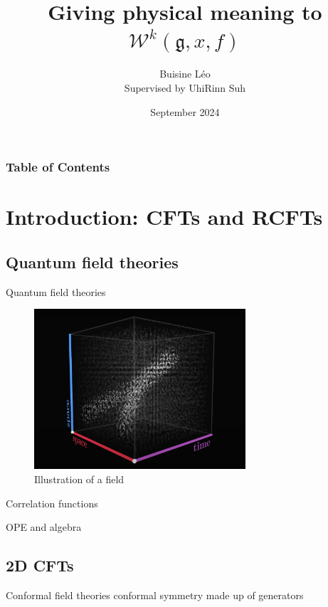 \documentclass{beamer}
\title{Giving physical meaning to $\mathcal{W}^k(\mathfrak{g}, x, f)$}
\author{Buisine Léo \\ Supervised by UhiRinn Suh}
\institute{\textit{Ecole Normale Superieure of Paris}\\ \textit{Seoul National University}}
\date{September 2024}
\begin{document}
\frame{\titlepage}

\begin{frame}
\frametitle{Table of Contents}
\tableofcontents
\end{frame}


\section{Introduction: CFTs and RCFTs}
\subsection{Quantum field theories}


\begin{frame}{Quantum field theories}
    \begin{figure}
      \centering
          \includegraphics[width=0.7\textwidth]{qft}
          \caption{Illustration of a field}
      \end{figure}
\end{frame}


\begin{frame}{Correlation functions}
    
\end{frame}

\begin{frame}{OPE and algebra}

\end{frame}


\subsection{2D CFTs}


\begin{frame}{Conformal field theories}
    conformal symmetry
    made up of generators
\end{frame}
\end{document}
